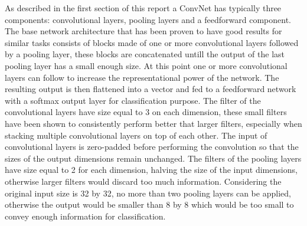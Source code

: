 \documentclass[12pt]{article}
\begin{document}
As described in the first section of this report a ConvNet has typically three components: convolutional layers, pooling layers and a feedforward component. The base network architecture that has been proven to have good results for similar tasks consists of blocks made of one or more convolutional layers followed by  a pooling layer, these blocks are concatenated untill the output of the last pooling layer has a small enough size. At this point one or more convolutional layers can follow to increase the representational power of the network. The resulting output is then flattened into a vector and fed to a feedforward network with a softmax output layer for classification purpose. The filter of the convolutional layers have size equal to 3 on each dimension, these small filters have been shown to consistently perform better that larger filters, especially when stacking multiple convolutional layers on top of each other. The input of convolutional layers is zero-padded before performing the convolution so that the sizes of the output dimensions remain unchanged. The filters of the pooling layers have size equal to 2 for each dimension, halving the size of the input dimensions, otherwise larger filters would discard too much information. Considering the original input size is 32 by 32, no more than two pooling layers can be applied, otherwise the output would be smaller than 8 by 8 which would be too small to convey enough information for classification.
\end{document}
